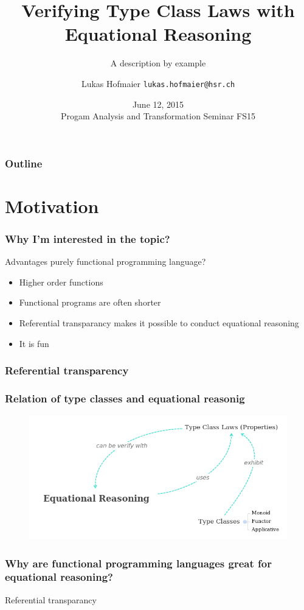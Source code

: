 \documentclass{beamer}
\title{Verifying Type Class Laws with Equational Reasoning}
\subtitle{A description by example}
\author{Lukas Hofmaier \texttt{lukas.hofmaier@hsr.ch}}
\date{June 12, 2015 \\ Progam Analysis and Transformation Seminar FS15}
\begin{document}
\maketitle
\begin{frame}
  \frametitle{Outline}
  \tableofcontents
\end{frame}

\section{Motivation}

\begin{frame}
  \frametitle{Why I'm interested in the topic?}
 Advantages purely functional programming language?
  \begin{itemize}
  \item Higher order functions
  \item Functional programs are often shorter
  \item {\color{red} Referential transparancy makes it possible to conduct equational reasoning}
  \item It is fun
  \end{itemize}
\end{frame}

\begin{frame}
\frametitle{Referential transparency}

\end{frame}

\begin{frame}
\frametitle{Relation of type classes and equational reasonig}
\begin{figure}
  \centering
     \includegraphics[scale=0.4]{mindmap}
\end{figure}
\end{frame}

\begin{frame}
 \frametitle{Why are functional programming languages great for equational reasoning?}
Referential transparancy
\end{frame}
\end{document}
